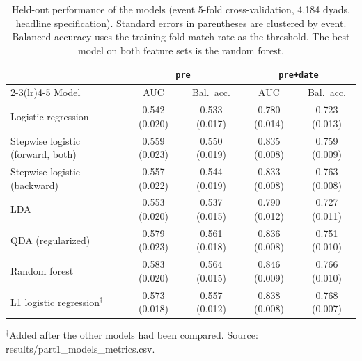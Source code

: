 \begin{table}[h]
\centering
\caption{Held-out performance of the models (event 5-fold cross-validation, 4,184 dyads, headline
specification). Standard errors in parentheses are clustered by event. Balanced accuracy uses the training-fold match
rate as the threshold. The best model on both feature sets is the random forest.}
\label{tab:models}
\begin{tabular}{l cc cc}
\toprule
 & \multicolumn{2}{c}{\texttt{pre}} & \multicolumn{2}{c}{\texttt{pre+date}} \\
\cmidrule(lr){2-3}\cmidrule(lr){4-5}
Model & AUC & Bal.\ acc. & AUC & Bal.\ acc. \\
\midrule
Logistic regression & 0.542 (0.020) & 0.533 (0.017) & 0.780 (0.014) & 0.723 (0.013) \\
Stepwise logistic (forward, both) & 0.559 (0.023) & 0.550 (0.019) & 0.835 (0.008) & 0.759 (0.009) \\
Stepwise logistic (backward) & 0.557 (0.022) & 0.544 (0.019) & 0.833 (0.008) & 0.763 (0.008) \\
LDA & 0.553 (0.020) & 0.537 (0.015) & 0.790 (0.012) & 0.727 (0.011) \\
QDA (regularized) & 0.579 (0.023) & 0.561 (0.018) & 0.836 (0.008) & 0.751 (0.010) \\
Random forest & 0.583 (0.020) & 0.564 (0.015) & 0.846 (0.009) & 0.766 (0.010) \\
L1 logistic regression$^\dagger$ & 0.573 (0.018) & 0.557 (0.012) & 0.838 (0.008) & 0.768 (0.007) \\
\bottomrule
\end{tabular}

\smallskip
{\footnotesize $^\dagger$Added after the other models had been compared. Source: results/part1\_models\_metrics.csv.}
\end{table}
